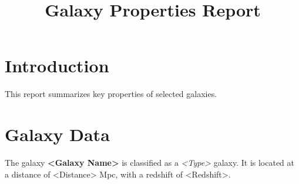 \documentclass{article}
\title{Galaxy Properties Report}
\author{}
\date{}
\begin{document}
\maketitle

\section{Introduction}
This report summarizes key properties of selected galaxies.

\section{Galaxy Data}
The galaxy \textbf{<Galaxy Name>} is classified as a \textit{<Type>} galaxy. 
It is located at a distance of <Distance> Mpc, with a redshift of <Redshift>.
\end{document}
